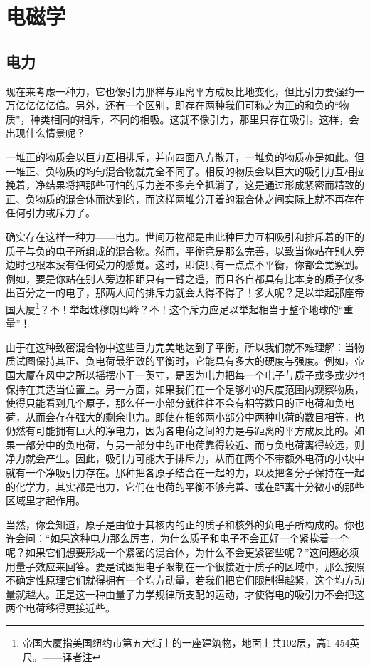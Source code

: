 \chapter{电磁学}

\section{电力}

现在来考虑一种力，它也像引力那样与距离平方成反比地变化，但比引力要强约一万亿亿亿亿倍。另外，还有一个区别，即存在两种我们可称之为正的和负的“物质”，种类相同的相斥，不同的相吸。这就不像引力，那里只存在吸引。这样，会出现什么情景呢？

一堆正的物质会以巨力互相排斥，并向四面八方散开，一堆负的物质亦是如此。但一堆正、负物质的均匀混合物就完全不同了。相反的物质会以巨大的吸引力互相拉挽着，净结果将把那些可怕的斥力差不多完全抵消了，这是通过形成紧密而精致的正、负物质的混合体而达到的，而这样两堆分开着的混合体之间实际上就不再存在任何引力或斥力了。

确实存在这样一种力——电力。世间万物都是由此种巨力互相吸引和排斥着的正的质子与负的电子所组成的混合物。然而，平衡竟是那么完善，以致当你站在别人旁边时也根本没有任何受力的感觉。这时，即使只有一点点不平衡，你都会觉察到。例如，要是你站在别人旁边相距只有一臂之遥，而且各自都具有比本身的质子仅多出百分之一的电子，那两人间的排斥力就会大得不得了！多大呢？足以举起那座帝国大厦\footnote{帝国大厦指美国纽约市第五大街上的一座建筑物，地面上共102层，高1 454英尺。——译者注}？不！举起珠穆朗玛峰？不！这个斥力应足以举起相当于整个地球的“重量”！

由于在这种致密混合物中这些巨力完美地达到了平衡，所以我们就不难理解：当物质试图保持其正、负电荷最细致的平衡时，它能具有多大的硬度与强度。例如，帝国大厦在风中之所以摇摆小于一英寸，是因为电力把每一个电子与质子或多或少地保持在其适当位置上。另一方面，如果我们在一个足够小的尺度范围内观察物质，使得只能看到几个原子，那么任一小部分就往往不会有相等数目的正电荷和负电荷，从而会存在强大的剩余电力。即使在相邻两小部分中两种电荷的数目相等，也仍然有可能拥有巨大的净电力，因为各电荷之间的力是与距离的平方成反比的。如果一部分中的负电荷，与另一部分中的正电荷靠得较近、而与负电荷离得较远，则净力就会产生。因此，吸引力可能大于排斥力，从而在两个不带额外电荷的小块中就有一个净吸引力存在。那种把各原子结合在一起的力，以及把各分子保持在一起的化学力，其实都是电力，它们在电荷的平衡不够完善、或在距离十分微小的那些区域里才起作用。

当然，你会知道，原子是由位于其核内的正的质子和核外的负电子所构成的。你也许会问：“如果这种电力那么厉害，为什么质子和电子不会正好一个紧挨着一个呢？如果它们想要形成一个紧密的混合体，为什么不会更紧密些呢？”这问题必须用量子效应来回答。要是试图把电子限制在一个很接近于质子的区域中，那么按照不确定性原理它们就得拥有一个均方动量，若我们把它们限制得越紧，这个均方动量就越大。正是这一种由量子力学规律所支配的运动，才使得电的吸引力不会把这两个电荷移得更接近些。

